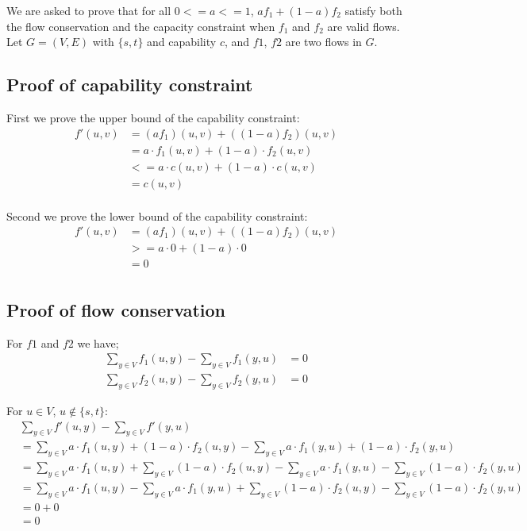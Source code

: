 \documentclass[12pt]{article}
\begin{document}
We are asked to prove that for all $0<=a<=1$, $af_1+(1-a)f_2$ satisfy both the flow conservation and the capacity constraint when $f_1$ and $f_2$ are valid flows. Let $G=(V,E)$ with $\{s, t\}$ and capability $c$, and $f1$, $f2$ are two flows in $G$.


\subsection{Proof of capability constraint}
First we prove the upper bound of the capability constraint:
\begin{equation}
\begin{aligned}
f'(u,v) &= (af_1)(u,v)+((1-a)f_2)(u,v) \\
 &= a \cdot f_1(u,v)+(1-a) \cdot  f_2(u,v) \\
 &<= a \cdot c(u,v)+(1-a) \cdot  c(u,v) \\
 &= c(u,v) \\
\end{aligned}
\end{equation}

Second we prove the lower bound of the capability constraint:
\begin{equation}
\begin{aligned}
f'(u,v) &= (af_1)(u,v)+((1-a)f_2)(u,v) \\
 &>= a \cdot 0+(1-a) \cdot 0 \\
 &= 0 \\
\end{aligned}
\end{equation}


\subsection{Proof of flow conservation}

For $f1$ and $f2$ we have;
\begin{equation}
\begin{aligned}
\sum_{y \in V} f_1(u,y) - \sum_{y \in V} f_1(y,u) &= 0 \\
\sum_{y \in V} f_2(u,y) - \sum_{y \in V} f_2(y,u) &= 0
\end{aligned}
\end{equation}


For $u \in V$, $u \notin \{s, t\}$: 
\begin{equation}
\begin{aligned}
&\sum_{y \in V} f'(u,y) - \sum_{y \in V} f'(y,u) \\
&= \sum_{y \in V} a \cdot f_1(u,y) + (1-a) \cdot f_2(u,y)  - \sum_{y \in V}  a \cdot f_1(y,u) + (1-a) \cdot f_2(y,u)\\ 
&= \sum_{y \in V} a \cdot f_1(u,y) + \sum_{y \in V}(1-a) \cdot f_2(u,y) - \sum_{y \in V}  a \cdot f_1(y,u) -  \sum_{y \in V}  (1-a) \cdot f_2(y,u)\\
&= \sum_{y \in V} a \cdot f_1(u,y)  - \sum_{y \in V}  a \cdot f_1(y,u) + \sum_{y \in V}(1-a) \cdot f_2(u,y) -  \sum_{y \in V}  (1-a) \cdot f_2(y,u)\\
&= 0 + 0\\
&= 0
\end{aligned}
\end{equation}
\end{document}
